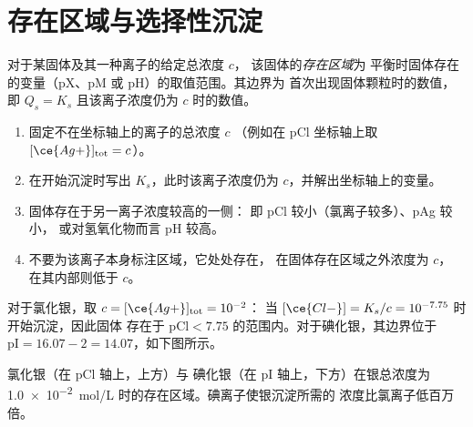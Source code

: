 \section{存在区域与选择性沉淀}\label{sec:b1:precipitation:domains}

\begin{definition}[存在区域]\label{def:b1:precipitation:existence-domain}
对于某固体及其一种离子的给定总浓度 $c$，
该固体的\emph{存在区域}为
平衡时固体存在的变量（pX、pM 或 pH）的取值范围。其边界为
首次出现固体颗粒时的数值，
即 $Q_s = K_s$ 且该离子浓度仍为 $c$ 时的数值。
\end{definition}

\begin{method}[绘制存在区域图]\label{met:b1:precipitation:existence-domain}
\begin{enumerate}
  \item 固定不在坐标轴上的离子的总浓度 $c$
        （例如在 pCl 坐标轴上取 $[\ce{Ag+}]_{\mathrm{tot}} = c$）。
  \item 在开始沉淀时写出 $K_s$，此时该离子浓度仍为
        $c$，并解出坐标轴上的变量。
  \item 固体存在于另一离子浓度较高的一侧：
        即 pCl 较小（氯离子较多）、pAg 较小，
        或对氢氧化物而言 pH 较高。
  \item 不要为该离子本身标注区域，它处处存在，
        在固体存在区域之外浓度为 $c$，
        在其内部则低于 $c$。
\end{enumerate}
\end{method}

对于氯化银，取 $c = [\ce{Ag+}]_{\mathrm{tot}} = 10^{-2}$：
当 $[\ce{Cl-}] = K_s/c = 10^{-7.75}$ 时开始沉淀，因此固体
存在于 $\mathrm{pCl} < 7.75$ 的范围内。对于碘化银，其边界位于
$\mathrm{pI} = 16.07 - 2 = 14.07$，如下图所示。

\begin{omfigure}

{\small 氯化银（在 pCl 轴上，上方）与
碘化银（在 pI 轴上，下方）在银总浓度为
\qty{1.0e-2}{mol/L} 时的存在区域。碘离子使银沉淀所需的
浓度比氯离子低百万倍。}
\end{omfigure}

